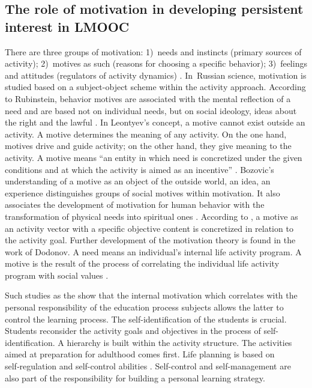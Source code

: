 \documentclass[english]{textolivre}
\begin{document}
\subsection{The role of motivation in developing persistent interest in LMOOC}\label{sec-fmt-manuscrito}
There are three groups of motivation: 1) needs and instincts (primary sources of activity); 2) motives as such (reasons for choosing a specific behavior); 3) feelings and attitudes (regulators of activity dynamics) \cite{petrovskiy_brief_1985,solso_experimental_2003}. In Russian science, motivation is studied based on a subject-object scheme within the activity approach. According to Rubinstein, behavior motives are associated with the mental reflection of a need and are based not on individual needs, but on social ideology, ideas about the right and the lawful \cite[p. 444]{rubinstein_fundamentals_2000}. In Leontyev’s concept, a motive cannot exist outside an activity. A motive determines the meaning of any activity. On the one hand, motives drive and guide activity; on the other hand, they give meaning to the activity. A motive means “an entity in which need is concretized under the given conditions and at which the activity is aimed as an incentive” \cite[p. 290]{leontyev_activity._1975}. Bozovic’s understanding of a motive as an object of the outside world, an idea, an experience distinguishes groups of social motives within motivation. It also associates the development of motivation for human behavior with the transformation of physical needs into spiritual ones \cite{bozhovich_personality_1968}. According to \textcite{manukyan_individual_1984}, a motive as an activity vector with a specific objective content is concretized in relation to the activity goal. Further development of the motivation theory is found in the work of Dodonov. A need means an individual’s internal life activity program. A motive is the result of the process of correlating the individual life activity program with social values \cite{dodonov_structure_1984}.

Such studies as the  show that the internal motivation which correlates with the personal responsibility of the education process subjects allows the latter to control the learning process. The self-identification of the students is crucial. Students reconsider the activity goals and objectives in the process of self-identification. A hierarchy is built within the activity structure. The activities aimed at preparation for adulthood comes first. Life planning is based on self‑regulation and self-control abilities \cite{leontyev_psychology_2000}. Self-control and self-management are also part of the responsibility for building a personal learning strategy.
\end{document}
